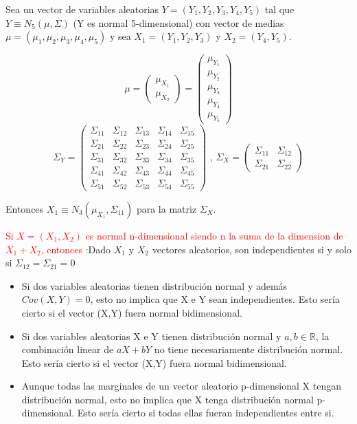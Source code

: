 \documentclass[palatino,nochap]{apuntes}
\begin{document}
\begin{example}
Sea un vector de variables aleatorias $Y=(Y_1, Y_2,Y_3, Y_4, Y_5)$ tal que $Y\equiv N_5(\mu, \Sigma)$ (Y es normal 5-dimensional) con vector de medias $\mu=(\mu_1, \mu_2, \mu_3, \mu_4, \mu_5)$ y sea $X_1=(Y_1,Y_2,Y_3)$ y $X_2=(Y_4,Y_5)$. 

\[
\mu=
\left(
\begin{array}{c}
\mu_{X_1}\\
\hline
\mu_{X_2}
\end{array}
\right)=
\left(
\begin{array}{c}
\mu_{Y_1}\\
\mu_{Y_2}\\
\mu_{Y_3}\\
\hline
\mu_{Y_4}\\
\mu_{Y_5}
\end{array}
\right)
\]
\[
\Sigma_Y=
\left(
\begin{array}{ccc|cc}
\Sigma_{11}& \Sigma_{12} & \Sigma_{13} & \Sigma_{14} & \Sigma_{15}\\
\Sigma_{21}& \Sigma_{22} & \Sigma_{23} & \Sigma_{24} & \Sigma_{25}\\
\Sigma_{31}& \Sigma_{32} & \Sigma_{33} & \Sigma_{34} & \Sigma_{35}\\
\hline
\Sigma_{41}& \Sigma_{42} & \Sigma_{43} & \Sigma_{44} & \Sigma_{45}\\
\Sigma_{51}& \Sigma_{52} & \Sigma_{53} & \Sigma_{54} & \Sigma_{55}
\end{array}
\right) \text{ , }
\Sigma_X=
\left(
\begin{array}{c|c}
\Sigma_{11}& \Sigma_{12} \\
\hline
\Sigma_{21}& \Sigma_{22} 
\end{array}
\right)
\]

Entonces $X_1\equiv N_3(\mu_{X_1}, \Sigma_{11})$ para la matriz $\Sigma_X$.
\end{example}

\begin{prop}
\textcolor{red}{Si $X=(X_1,X_2)$ es normal n-dimensional siendo n la suma de la dimension de $X_1+X_2$, entonces :}Dado $X_1$ y $X_2$ vectores aleatorios, son independientes si y solo si $\Sigma_{12}=\Sigma_{21}=0$
\end{prop}

\begin{obs}
\begin{itemize}
\item Si dos variables aleatorias tienen distribución normal y además $Cov(X,Y)=0$, esto no implica que X e Y sean independientes. Esto sería cierto si el vector (X,Y) fuera normal bidimensional.
\item Si dos variables aleatorias X e Y tienen distribución normal y $a,b \in \mathbb{R}$, la combinación linear de $aX+bY$ no tiene necesariamente distribución normal. Esto sería cierto si el vector (X,Y) fuera normal bidimensional.
\item Aunque todas las marginales de un vector aleatorio p-dimensional X tengan distribución normal, esto no implica que X tenga distribución normal p-dimensional. Esto sería cierto si todas ellas fueran independientes entre si.
\end{itemize}
\end{obs}
\end{document}
